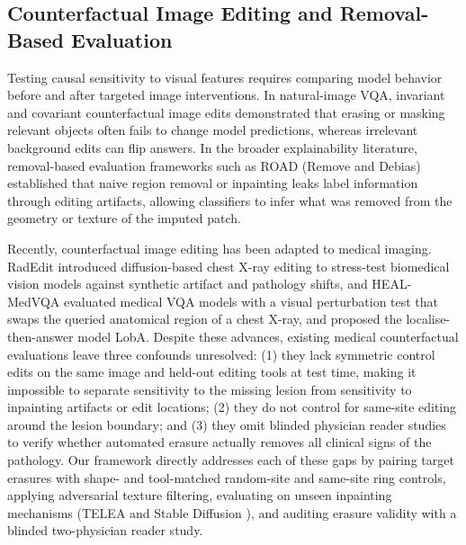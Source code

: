 \documentclass[5p,times,twocolumn,authoryear]{elsarticle}
\begin{document}
\subsection{Counterfactual Image Editing and Removal-Based Evaluation}
\label{subsec:rw_counterfactual}
Testing causal sensitivity to visual features requires comparing model behavior before and after targeted image interventions. In natural-image VQA, invariant and covariant counterfactual image edits \citep{agarwal2020towards} demonstrated that erasing or masking relevant objects often fails to change model predictions, whereas irrelevant background edits can flip answers. In the broader explainability literature, removal-based evaluation frameworks such as ROAD (Remove and Debias) \citep{rong2022road} established that naive region removal or inpainting leaks label information through editing artifacts, allowing classifiers to infer what was removed from the geometry or texture of the imputed patch.

Recently, counterfactual image editing has been adapted to medical imaging. RadEdit \citep{perez2024radedit} introduced diffusion-based chest X-ray editing to stress-test biomedical vision models against synthetic artifact and pathology shifts, and HEAL-MedVQA \citep{healmedvqa2024} evaluated medical VQA models with a visual perturbation test that swaps the queried anatomical region of a chest X-ray, and proposed the localise-then-answer model LobA. Despite these advances, existing medical counterfactual evaluations leave three confounds unresolved: (1) they lack symmetric control edits on the same image and held-out editing tools at test time, making it impossible to separate sensitivity to the missing lesion from sensitivity to inpainting artifacts or edit locations; (2) they do not control for same-site editing around the lesion boundary; and (3) they omit blinded physician reader studies to verify whether automated erasure actually removes all clinical signs of the pathology. Our framework directly addresses each of these gaps by pairing target erasures with shape- and tool-matched random-site and same-site ring controls, applying adversarial texture filtering, evaluating on unseen inpainting mechanisms (TELEA \citep{telea2004image} and Stable Diffusion \citep{rombach2022high}), and auditing erasure validity with a blinded two-physician reader study.
\end{document}
